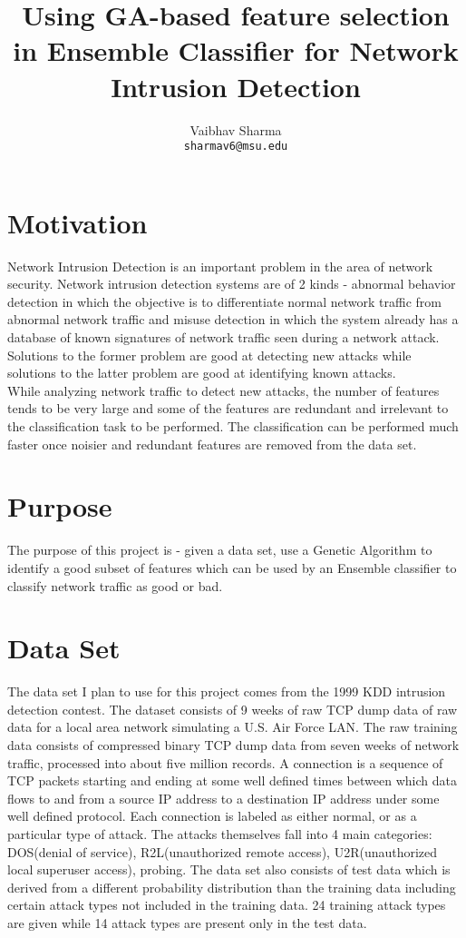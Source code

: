 \documentclass{article}
\title{Using GA-based feature selection in Ensemble Classifier for Network Intrusion Detection}
\author{Vaibhav Sharma \\
\texttt{sharmav6@msu.edu}\\
}
\begin{document}
\maketitle


\section{Motivation}

Network Intrusion Detection is an important problem in the area of
network security. Network intrusion detection systems are of 2 kinds -
abnormal behavior detection in which the objective is to differentiate
normal network traffic from abnormal network traffic and misuse
detection in which the system already has a database of known signatures
of network traffic seen during a network attack. 
Solutions to the former problem are good at detecting new attacks while solutions to the latter
problem are good at identifying known attacks. \\
While analyzing network traffic to detect new attacks, the number of features tends to be very large and some of the features are redundant and irrelevant to the classification task to be performed. The classification can be performed much faster once noisier and redundant features are removed from the data set.

\section{Purpose}
The purpose of this project is - given a data set, use a Genetic Algorithm to identify a good subset of features which can be used by an Ensemble classifier to classify network traffic as good or bad. 

\section{Data Set}
The data set I plan to use for this project comes from the 1999 KDD
intrusion detection contest\cite{kdd1999}. The dataset consists of 9 weeks of raw
TCP dump data of raw data for a local area network simulating a U.S. Air
Force LAN. The raw training data consists of compressed binary TCP dump
data from seven weeks of network traffic, processed into about five
million records. A connection is a sequence of TCP packets starting and
ending at some well defined times between which data flows to and from a
source IP address to a destination IP address under some well defined
protocol. Each connection is labeled as either normal, or as a
particular type of attack. 
The attacks themselves fall into 4 main categories: DOS(denial of
service), R2L(unauthorized remote access), U2R(unauthorized local
superuser access), probing. 
The data set also consists of test data which is derived from a
different probability distribution than the training data including
certain attack types not included in the training data. 24 training
attack types are given while 14 attack types are present only in the
test data.
\end{document}
